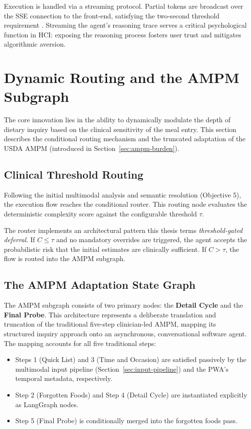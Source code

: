 Execution is handled via a streaming protocol. Partial tokens are broadcast over the SSE connection to the front-end, satisfying the two-second threshold requirement \citep{nahStudyTolerableWaiting2004}. Streaming the agent's reasoning trace serves a critical psychological function in HCI: exposing the reasoning process fosters user trust and mitigates algorithmic aversion.

\section{Dynamic Routing and the AMPM Subgraph}

The core innovation lies in the ability to dynamically modulate the depth of dietary inquiry based on the clinical sensitivity of the meal entry. This section describes the conditional routing mechanism and the truncated adaptation of the USDA AMPM (introduced in Section~\ref{sec:ampm-burden}).

\subsection{Clinical Threshold Routing}
\label{sec:threshold-routing}

Following the initial multimodal analysis and semantic resolution (Objective 5), the execution flow reaches the conditional router. This routing node evaluates the deterministic complexity score against the configurable threshold $\tau$.

The router implements an architectural pattern this thesis terms \emph{threshold-gated deferral}. If $C \leq \tau$ and no mandatory overrides are triggered, the agent accepts the probabilistic risk that the initial estimates are clinically sufficient. If $C > \tau$, the flow is routed into the AMPM subgraph.

\subsection{The AMPM Adaptation State Graph}

The AMPM subgraph consists of two primary nodes: the \textbf{Detail Cycle} and the \textbf{Final Probe}. This architecture represents a deliberate translation and truncation of the traditional five-step clinician-led AMPM, mapping its structured inquiry approach onto an asynchronous, conversational software agent. The mapping accounts for all five traditional steps:

\begin{itemize}
    \item Steps 1 (Quick List) and 3 (Time and Occasion) are satisfied passively by the multimodal input pipeline (Section~\ref{sec:input-pipeline}) and the PWA's temporal metadata, respectively.
    \item Step 2 (Forgotten Foods) and Step 4 (Detail Cycle) are instantiated explicitly as LangGraph nodes.
    \item Step 5 (Final Probe) is conditionally merged into the forgotten foods pass.
\end{itemize}


